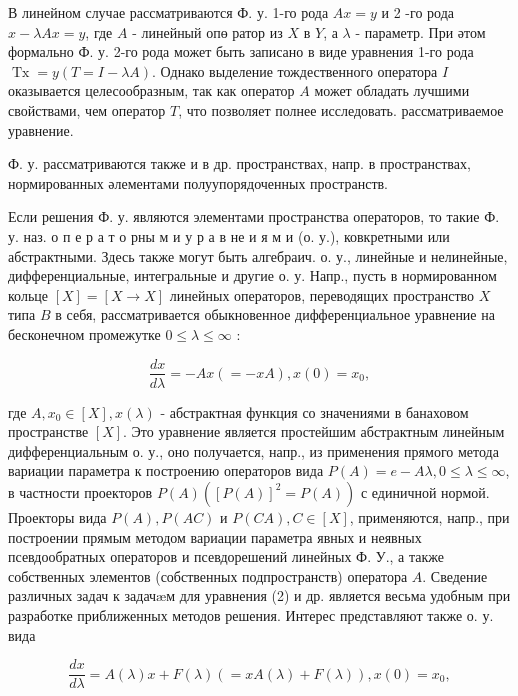 \documentclass[10pt]{article}
\begin{document}
В линейном случае рассматриваются Ф. у. 1-го рода $A x=y$ и 2 -го рода $x-\lambda A x=y$, где $A$ - линейный опө ратор из $X$ в $Y$, а $\lambda$ - параметр. При әтом формально Ф. у. 2-го рода может быть записано в виде уравнения 1-го рода $\operatorname{Tx}=y(T=I-\lambda A)$. Однако выделение тождественного оператора $I$ оказывается целесообразным, так как оператор $A$ может обладать лучшими свойствами, чем оператор $T$, что позволяет полнее исследовать. рассматриваемое уравнение.



Ф. у. рассматриваются также и в др. пространствах, напр. в пространствах, нормированных әлементами полуупорядоченных пространств.



Если решения Ф. у. являются элементами пространства операторов, то такие Ф. у. наз. о п е р а т о рны м и у р а в не и я м и (о. у.), ковкретными или абстрактными. Здесь также могут быть алгебраич. о. у., линейные и нелинейные, дифференциальные, интегральные и другие о. у. Напр., пусть в нормированном кольце $[X]=[X \rightarrow X]$ линейных операторов, переводящих пространство $X$ типа $B$ в себя, рассматривается обыкновенное дифференциальное уравнение на бесконечном промежутке $0 \leqslant \lambda \leqslant \infty$ :



\[

\frac{d x}{d \lambda}=-A x(=-x A), x(0)=x_{0},

\]



где $A, x_{0} \in[X], x(\lambda)$ - абстрактная функция со значениями в банаховом пространстве $[X]$. Это уравнение является простейшим абстрактным линейным дифференциальным о. у., оно получается, напр., из применения прямого метода вариации параметра к построению операторов вида $P(A)=e-A \lambda, 0 \leqslant \lambda \leqslant \infty$, в частности проекторов $P(A)\left([P(A)]^{2}=P(A)\right)$ с единичной нормой. Проекторы вида $P(A), P(A C)$ и $P(C A), C \in[X]$, применяются, напр., при построении прямым методом вариации параметра явных и неявных псевдообратных операторов и псевдорешений линейных Ф. У., а также собственных элементов (собственных подпространств) оператора $A$. Сведение различных задач к задачæм для уравнения (2) и др. является весьма удобным при разработке приближенных методов решения. Интерес представляют также о. у. вида



\[

\frac{d x}{d \lambda}=A(\lambda) x+F(\lambda)(=x A(\lambda)+F(\lambda)), x(0)=x_{0},

\]
\end{document}
